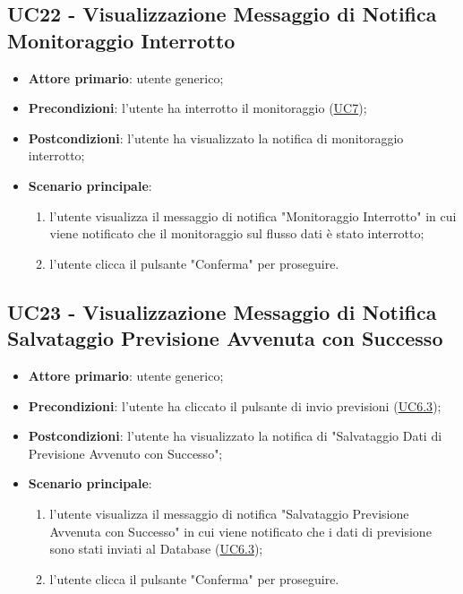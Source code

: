 
	\label{par:UC22}
	\subsection{UC22 - Visualizzazione Messaggio di Notifica Monitoraggio Interrotto}
		\begin{itemize}
			\item\textbf{Attore primario}: utente generico;
			\item\textbf{Precondizioni}: l’utente ha interrotto il monitoraggio (\hyperref[par:UC7]{UC7});
			\item\textbf{Postcondizioni}: l’utente ha visualizzato la notifica di monitoraggio interrotto;
			\item\textbf{Scenario principale}:
				\begin{enumerate}
					\item l’utente visualizza il messaggio di notifica "Monitoraggio Interrotto" in cui viene notificato che il monitoraggio sul flusso dati è stato interrotto;
					\item l'utente clicca il pulsante "Conferma" per proseguire.		
				\end{enumerate}		
		\end{itemize}


		
	\label{par:UC23}
	\subsection{UC23 - Visualizzazione Messaggio di Notifica Salvataggio Previsione Avvenuta con Successo}	\begin{itemize}
			\item\textbf{Attore primario}: utente generico;
			\item\textbf{Precondizioni}: l'utente ha cliccato il pulsante di invio previsioni (\hyperref[par:UC6.3]{UC6.3});
			\item\textbf{Postcondizioni}: l'utente ha visualizzato la notifica di "Salvataggio Dati di Previsione Avvenuto con Successo";
			\item\textbf{Scenario principale}:
				\begin{enumerate}
					\item l’utente visualizza il messaggio di notifica "Salvataggio Previsione Avvenuta con Successo" in cui viene notificato che i dati di previsione sono stati inviati al Database (\hyperref[par:UC6.3]{UC6.3});
					\item l'utente clicca il pulsante "Conferma" per proseguire.		
				\end{enumerate}		
		\end{itemize}

